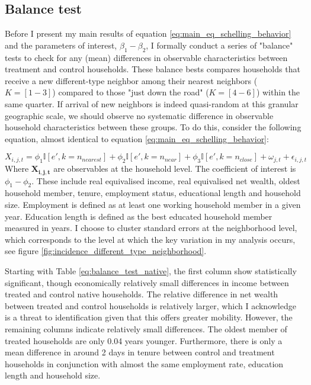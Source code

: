 \documentclass[main.tex]{subfiles}
\begin{document}
\subsection{Balance test}
Before I present my main results of equation \ref{eq:main_eq_schelling_behavior} and the parameters of interest, $\beta_1-\beta_2$, I formally conduct a series of "balance" tests to check for any (mean) differences in observable characteristics between treatment and control households. These balance bests compares households that receive a new different-type neighbor among their nearest neighbors ($K=[1-3]$) compared to those "just down the road" ($K=[4-6]$) within the same quarter. If arrival of new neighbors is indeed quasi-random at this granular geographic scale, we should observe no systematic difference in observable household characteristics between these groups. To do this, consider the following equation, almost identical to equation \ref{eq:main_eq_schelling_behavior}:

\begin{equation}
    X_{i, j, t} = \phi_1 \mathbb{I}[e', k=n_{nearest}] + \phi_2 \mathbb{I}[e', k = n_{near}] + \phi_3 \mathbb{I}[e', k = n_{close}] + \omega_{j, t} + \epsilon_{i, j, t} 
    \label{eq:balance_tests}
\end{equation}
Where $\mathbf{X_{i,j,t}}$ are observables at the household level. The coefficient of interest is $\phi_1 - \phi_2$. These include real equivalised income, real equivalised net wealth, oldest household member, tenure, employment status, educational length and household size. Employment is defined as at least one working household member in a given year. Education length is defined as the best educated household member measured in years. I choose to cluster standard errors at the neighborhood level, which corresponds to the level at which the key variation in my analysis occurs, see figure \ref{fig:incidence_different_type_neighborhood}. 

Starting with Table \ref{eq:balance_test_native}, the first column show statistically significant, though economically relatively small differences in income between treated and control native households. The relative difference in net wealth between treated and control households is relatively larger, which I acknowledge is a threat to identification given that this offers greater mobility. However, the remaining columns indicate relatively small differences. The oldest member of treated households are only 0.04 years younger. Furthermore, there is only a mean difference in around 2 days in tenure between control and treatment households in conjunction with almost the same employment rate, education length and household size. 
\end{document}
